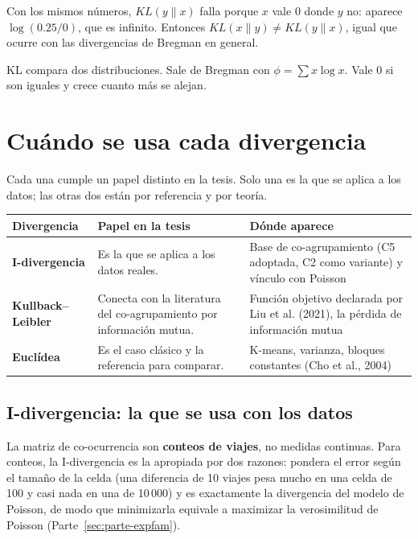 \documentclass[11pt,a4paper]{article}
\newenvironment{idea}{\par\begin{center}\begin{lrbox}{\ideabox}\begin{minipage}{0.9\linewidth}}{\end{minipage}\end{lrbox}\fcolorbox{blue!40!black}{blue!5}{\usebox{\ideabox}}\end{center}}
\begin{document}
Con los mismos números, $KL(y\|x)$ falla porque $x$ vale 0 donde $y$ no: aparece
$\log(0.25/0)$, que es infinito. Entonces $KL(x\|y)\ne KL(y\|x)$, igual que ocurre
con las divergencias de Bregman en general.

\begin{idea}
KL compara dos distribuciones. Sale de Bregman con $\phi=\sum x\log x$. Vale 0 si
son iguales y crece cuanto más se alejan.
\end{idea}

\section{Cuándo se usa cada divergencia}

Cada una cumple un papel distinto en la tesis. Solo una es la que se aplica a los
datos; las otras dos están por referencia y por teoría.

\begin{center}
\renewcommand{\arraystretch}{1.3}
\begin{tabular}{@{}>{\raggedright\arraybackslash}p{3.0cm}>{\raggedright\arraybackslash}p{6.2cm}>{\raggedright\arraybackslash}p{5.0cm}@{}}
\toprule
\textbf{Divergencia} & \textbf{Papel en la tesis} & \textbf{Dónde aparece} \\
\midrule
\textbf{I-divergencia} & Es la que se aplica a los datos reales. & Base de co-agrupamiento (C5 adoptada, C2 como variante) y vínculo con Poisson \\
\midrule
\textbf{Kullback--Leibler} & Conecta con la literatura del co-agrupamiento por información mutua. & Función objetivo declarada por Liu et al. (2021), la pérdida de información mutua \\
\midrule
\textbf{Euclídea} & Es el caso clásico y la referencia para comparar. & K-means, varianza, bloques constantes (Cho et al., 2004) \\
\bottomrule
\end{tabular}
\end{center}

\subsection{I-divergencia: la que se usa con los datos}

La matriz de co-ocurrencia son \textbf{conteos de viajes}, no medidas continuas.
Para conteos, la I-divergencia es la apropiada por dos razones: pondera el error
según el tamaño de la celda (una diferencia de 10 viajes pesa mucho en una celda
de 100 y casi nada en una de 10\,000) y es exactamente la divergencia del modelo
de Poisson, de modo que minimizarla equivale a maximizar la verosimilitud de
Poisson (Parte~\ref{sec:parte-expfam}).
\end{document}
